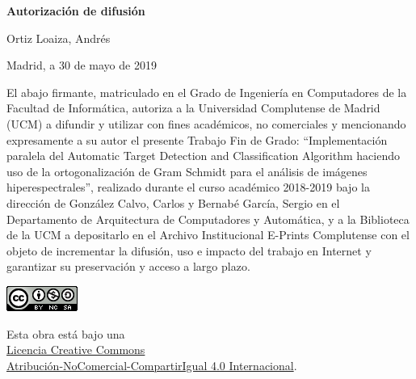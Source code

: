 
\newpage

\thispagestyle{empty}

\begin{center}

{\bf \Huge Autorización de difusión}

\vspace{1cm}


   {\large Ortiz Loaiza, Andrés}\\

   \vspace{0.5cm}

% 
   Madrid, a 30 de mayo de 2019\\

   \vspace{0.5cm} \end{center}

El abajo firmante, matriculado en el Grado de Ingeniería en Computadores de la
Facultad de Informática, autoriza a la Universidad Complutense de Madrid (UCM) a
difundir y utilizar con fines académicos, no comerciales y mencionando
expresamente a su autor el presente Trabajo Fin de Grado: “Implementación paralela del Automatic Target Detection
and Classification Algorithm haciendo uso de la ortogonalización de Gram Schmidt para el análisis de imágenes
hiperespectrales”, realizado durante el curso académico 2018-2019 bajo la dirección de González Calvo, Carlos y
Bernabé García, Sergio en el Departamento de Arquitectura de Computadores y Automática, y a la
Biblioteca de la UCM a depositarlo en el Archivo Institucional E-Prints
Complutense con el objeto de incrementar la difusión, uso e impacto del trabajo
en Internet y garantizar su preservación y acceso a largo plazo.

{
\begin{center}
\vfill
\includegraphics{images/copy_right/cc-by-nc-sa.png}
\tiny

Esta obra está bajo una\\
\href{http://creativecommons.org/licenses/by-nc-sa/4.0/}{Licencia Creative Commons\\Atribución-NoComercial-CompartirIgual 4.0 Internacional}.
\end{center}
}